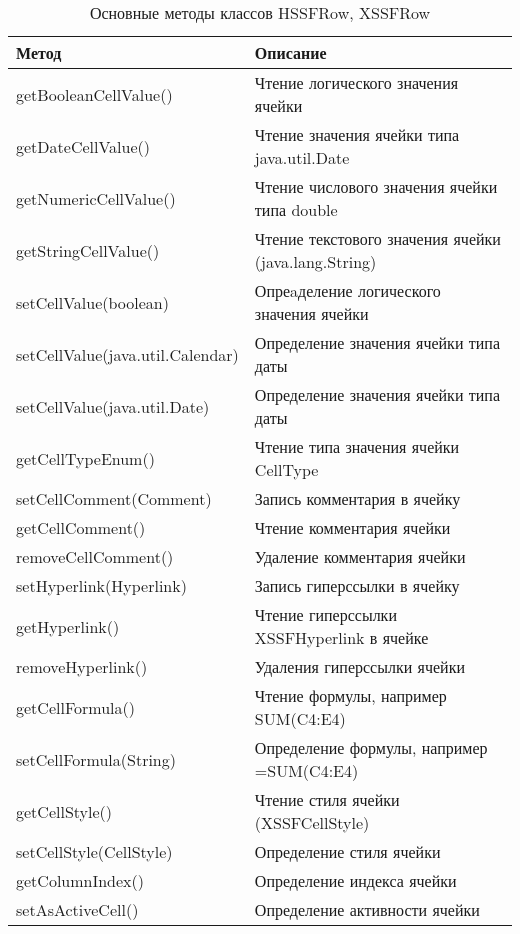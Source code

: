 \begin{table}[!h]
	\begin{center}
		\caption{Основные методы классов HSSFRow, XSSFRow}
		\label{tab:listOfComponentsWithCell}
		\begin{tabular}{l|l}
			\textbf{Метод} & \textbf{Описание} \\
			\hline
			getBooleanCellValue() & Чтение логического значения ячейки \\
			getDateCellValue() & Чтение значения ячейки типа java.util.Date  \\
			getNumericCellValue()  & Чтение числового значения ячейки типа double \\ 
			getStringCellValue() & Чтение текстового значения ячейки (java.lang.String) \\
			setCellValue(boolean) & Опреaделение логического значения ячейки \\
			setCellValue(java.util.Calendar) & Определение значения ячейки типа даты \\
			setCellValue(java.util.Date) & Определение значения ячейки типа даты\\
			getCellTypeEnum() & Чтение типа значения ячейки CellType \\
			setCellComment(Comment) & Запись комментария в ячейку \\
			getCellComment() & Чтение комментария ячейки \\
			removeCellComment() & Удаление комментария ячейки \\
			setHyperlink(Hyperlink) & Запись гиперссылки в ячейку \\
			getHyperlink() & Чтение гиперссылки XSSFHyperlink в ячейке \\
			removeHyperlink() & Удаления гиперссылки ячейки \\
			getCellFormula() &  Чтение формулы, например SUM(C4:E4) \\
			setCellFormula(String) & Определение формулы, например =SUM(C4:E4) \\
			getCellStyle() & Чтение стиля ячейки (XSSFCellStyle) \\
			setCellStyle(CellStyle) & Определение стиля ячейки \\
			getColumnIndex() & Определение индекса ячейки \\
			setAsActiveCell() & Определение активности ячейки \\
		\end{tabular}
	\end{center}
\end{table}

